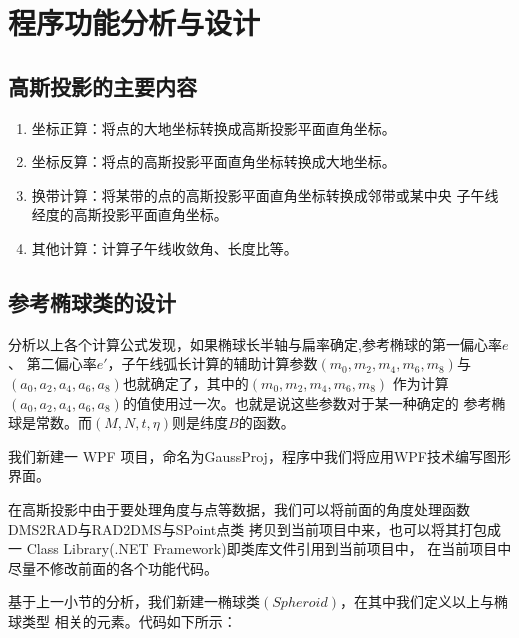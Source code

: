 \section{程序功能分析与设计}

\subsection{高斯投影的主要内容}
\begin{enumerate}
    \item 坐标正算：将点的大地坐标转换成高斯投影平面直角坐标。
    \item 坐标反算：将点的高斯投影平面直角坐标转换成大地坐标。
    \item 换带计算：将某带的点的高斯投影平面直角坐标转换成邻带或某中央
    子午线经度的高斯投影平面直角坐标。
    \item 其他计算：计算子午线收敛角、长度比等。
\end{enumerate}

\subsection{参考椭球类的设计}

分析以上各个计算公式发现，如果椭球长半轴与扁率确定,参考椭球的第一偏心率$e$、
第二偏心率$e'$，子午线弧长计算的辅助计算参数$(m_0, m_2, m_4, m_6, m_8)$与
$(a_0, a_2, a_4, a_6, a_8)$也就确定了，其中的$(m_0, m_2, m_4, m_6, m_8)$
作为计算$(a_0, a_2, a_4, a_6, a_8)$的值使用过一次。也就是说这些参数对于某一种确定的
参考椭球是常数。而$(M,N,t,\eta)$则是纬度$B$的函数。

我们新建一 WPF 项目，命名为GaussProj，程序中我们将应用WPF技术编写图形界面。

在高斯投影中由于要处理角度与点等数据，我们可以将前面的角度处理函数DMS2RAD与RAD2DMS与SPoint点类
拷贝到当前项目中来，也可以将其打包成一 Class Library(.NET Framework)即类库文件引用到当前项目中，
在当前项目中尽量不修改前面的各个功能代码。

基于上一小节的分析，我们新建一椭球类$(Spheroid)$，在其中我们定义以上与椭球类型
相关的元素。代码如下所示：

